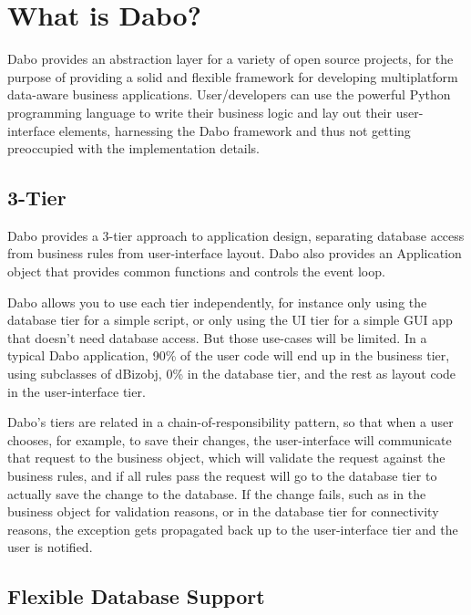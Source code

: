 
\chapter{What is Dabo?}

Dabo provides an abstraction layer for a variety of open source projects, for the 
purpose of providing a solid and flexible framework for developing multiplatform 
data-aware business applications. User/developers can use the powerful Python 
programming language to write their business logic and lay out their user-interface 
elements, harnessing the Dabo framework and thus not getting preoccupied with the 
implementation details.

\section{3-Tier}

Dabo provides a 3-tier approach to application design, separating database access 
from business rules from user-interface layout. Dabo also provides an Application 
object that provides common functions and controls the event loop.

Dabo allows you to use each tier independently, for instance only using the database 
tier for a simple script, or only using the UI tier for a simple GUI app that doesn't 
need database access. But those use-cases will be limited. In a typical Dabo 
application, 90\% of the user code will end up in the business tier, using subclasses 
of dBizobj, 0\% in the database tier, and the rest as layout code 
in the user-interface tier.

Dabo's tiers are related in a chain-of-responsibility pattern, so that when a user 
chooses, for example, to save their changes, the user-interface will communicate 
that request to the business object, which will validate the request against the 
business rules, and if all rules pass the request will go to the database tier to 
actually save the change to the database. If the change fails, such as in the 
business object for validation reasons, or in the database tier for connectivity 
reasons, the exception gets propagated back up to the user-interface tier and the 
user is notified.

\section{Flexible Database Support}

